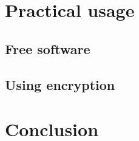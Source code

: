 \documentclass[compress]{beamer}
\theoremstyle{definition}
\theoremstyle{definition}
\theoremstyle{definition}
\theoremstyle{remark}
\theoremstyle{remark}
\theoremstyle{definition}
\theoremstyle{definition}
\theoremstyle{definition}
\theoremstyle{definition}
\theoremstyle{definition}
\theoremstyle{remark}
\theoremstyle{remark}
\theoremstyle{remark}
\theoremstyle{remark}
\begin{document}
		\section{Practical usage}\frame{\sectionpage}
			\subsection{Free software}
			\begin{frame}
			\end{frame}
			\subsection{Using encryption}
				\begin{frame}
				\end{frame}
		
				
		
		\nocite{*}
	         
	         \section*{Conclusion}
				\begin{frame}
				\end{frame}
	
\end{document}
